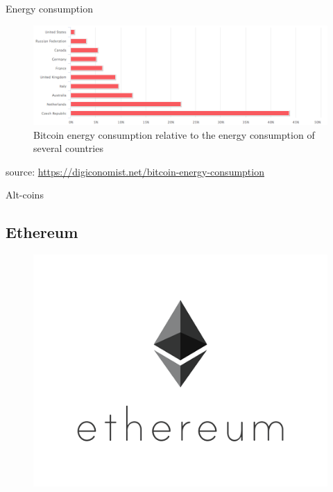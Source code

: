 \documentclass[10pt]{beamer}
\begin{document}
\begin{frame}{Energy consumption}
	\begin{figure}[]
		\centering
		\includegraphics  [scale=0.3]{Images/bitcoin-energy}
		\caption{Bitcoin energy consumption relative to the energy consumption of several countries}
	\end{figure}
	\begin{scriptsize}
		source: \href{https://digiconomist.net/bitcoin-energy-consumption}{https://digiconomist.net/bitcoin-energy-consumption}
	\end{scriptsize}
\end{frame}



\begin{frame}
\begin{center}
\begin{large}
Alt-coins
\end{large}
\end{center}
\end{frame}

\subsection{Ethereum}

\begin{frame}
	\begin{figure}[]
		\centering
		\includegraphics  [scale=0.3]{Images/ethereum-logo}
	\end{figure}
\end{frame}
\end{document}
